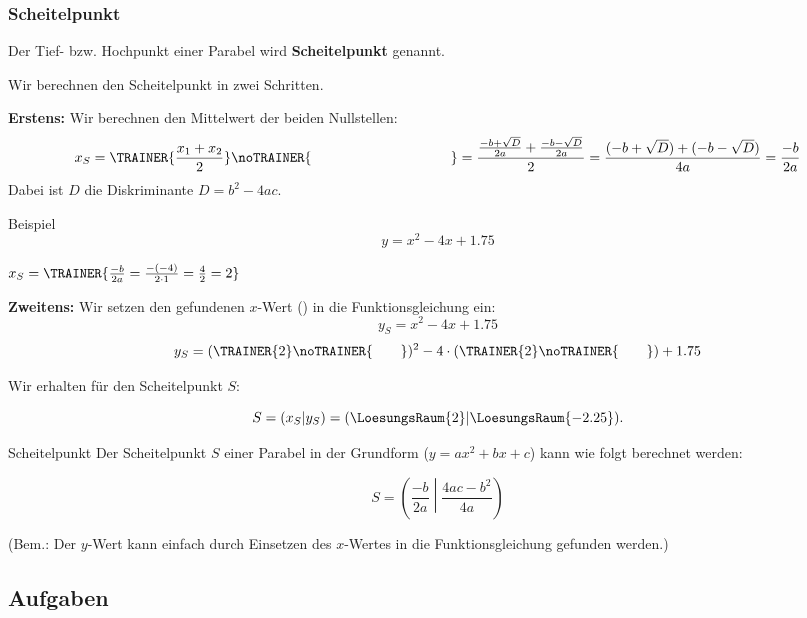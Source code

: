\subsubsection{Scheitelpunkt}
Der Tief- bzw. Hochpunkt einer Parabel wird \textbf{Scheitelpunkt}
genannt.

Wir berechnen den Scheitelpunkt in zwei Schritten.

\textbf{Erstens:} Wir berechnen den Mittelwert der beiden Nullstellen:
$$x_S = \TRAINER{\frac{x_{1} + x_{2}}{2}}\noTRAINER{\hspace{35mm}} = \frac{\frac{-b+\sqrt{D}}{2a} + \frac{-b-\sqrt{D}}{2a}}{2} =
\frac{(-b+\sqrt{D}) + (-b-\sqrt{D})}{4a} =\frac{-b}{2a}$$
Dabei ist $D$ die Diskriminante $D=b^2-4ac$.

Beispiel
$$y = x^2 - 4x + 1.75$$

\vspace{15mm}

$x_S = \TRAINER{\frac{-b}{2a} = \frac{-(-4)}{2\cdot{}1} = \frac{4}{2} = 2}$

\vspace{3cm}

\textbf{Zweitens:} Wir setzen den gefundenen $x$-Wert
() in die Funktionsgleichung
ein:
$$y_S = x^2 - 4x + 1.75$$
$$y_S = (\TRAINER{2}\noTRAINER{\hspace{7mm}})^2 - 4\cdot{}(\TRAINER{2}\noTRAINER{\hspace{7mm}}) + 1.75$$

Wir erhalten für den Scheitelpunkt $S$:

$$S=(x_S | y_S) = (\LoesungsRaum{2} | \LoesungsRaum{-2.25}).$$
\newpage


\begin{gesetz}{Scheitelpunkt}{}
  Der Scheitelpunkt $S$ einer Parabel in der Grundform ($y=ax^2+bx+c$) kann wie folgt
  berechnet werden:

  $$S=\left(\frac{-b}{2a}\middle|\frac{4ac-b^2}{4a}\right)$$

  (Bem.: Der $y$-Wert kann einfach durch Einsetzen des $x$-Wertes in
  die Funktionsgleichung gefunden werden.)
  \end{gesetz}
  
\subsection*{Aufgaben}

